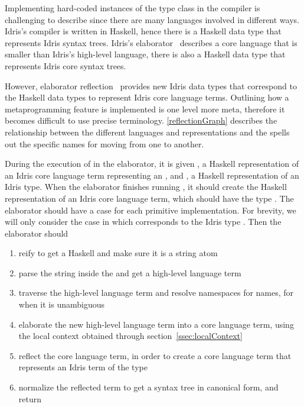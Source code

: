 Implementing hard-coded instances of the \Editorable{} type class in the
compiler is challenging to describe since there are many languages involved in
different ways. Idris's compiler is written in Haskell, hence there is a
Haskell data type that represents Idris syntax trees. Idris's
elaborator~\citep{idris} describes a core language that is smaller than Idris's
high-level language, there is also a Haskell data type that represents Idris
core syntax trees.

However, elaborator reflection~\citep{davidphd, elabref} provides new Idris
data types that correspond to the Haskell data types to represent Idris core
language terms.
Outlining how a metaprogramming feature is implemented is one level more meta,
therefore it becomes difficult to use precise terminology.
\autoref{reflectionGraph} describes the relationship between the different
languages and representations and the spells out the specific names for moving
from one to another.

During the execution of  in the elaborator, it is given
, a Haskell representation of an Idris core language term representing
an \sexp{}, and , a Haskell representation of an Idris type.
When the elaborator finishes running , it should create
the Haskell representation of an Idris core language term, which should have the
type . The elaborator should have a case for each primitive
\Editorable{} implementation. For brevity, we will only consider the case in
which  corresponds to the Idris type \TT{}. Then the elaborator should

\begin{enumerate}
  \item reify  to get a Haskell \sexp{} and make sure it is a string atom
  \item parse the string inside the \sexp{} and get a high-level language term
  \item traverse the high-level language term and resolve namespaces for names, for when it is unambiguous
  \item elaborate the new high-level language term into a core language term, using the local context obtained through section~\ref{ssec:localContext}
  \item reflect the core language term, in order to create a core language term that represents an Idris term of the type \TT{}
  \item normalize the reflected term to get a syntax tree in canonical form, and return
\end{enumerate}

